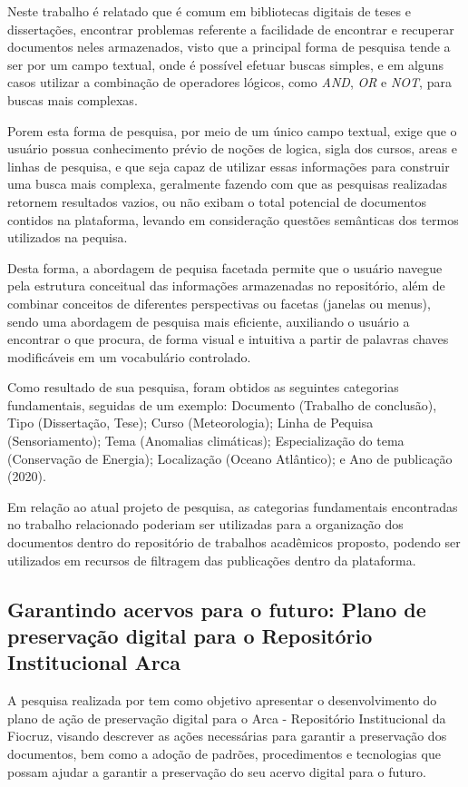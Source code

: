 Neste trabalho é relatado que é comum em bibliotecas digitais de teses
e dissertações, encontrar problemas referente a facilidade de encontrar
e recuperar documentos neles armazenados, visto que a principal forma de
pesquisa tende a ser por um campo textual, onde é possível efetuar buscas
simples, e em alguns casos utilizar a combinação de operadores lógicos, como
\emph{AND}, \emph{OR} e \emph{NOT}, para buscas mais complexas.

Porem esta forma de pesquisa, por meio de um único campo textual,
exige que o usuário possua conhecimento prévio de noções de logica,
sigla dos cursos, areas e linhas de pesquisa, e que seja capaz de
utilizar essas informações para construir uma busca mais complexa,
geralmente fazendo com que as pesquisas realizadas retornem resultados
vazios, ou não exibam o total potencial de documentos contidos na plataforma,
levando em consideração questões semânticas dos termos utilizados na pequisa.

Desta forma, a abordagem de pequisa facetada permite que o usuário navegue
pela estrutura conceitual das informações armazenadas no repositório, além de
combinar conceitos de diferentes perspectivas ou facetas (janelas ou menus), sendo uma abordagem
de pesquisa mais eficiente, auxiliando o usuário a encontrar o que procura,
de forma visual e intuitiva a partir de palavras chaves modificáveis em um
vocabulário controlado.

Como resultado de sua pesquisa, foram obtidos as seguintes categorias
fundamentais, seguidas de um exemplo: Documento (Trabalho de conclusão), Tipo (Dissertação, Tese);
Curso (Meteorologia); Linha de Pequisa (Sensoriamento);
Tema (Anomalias climáticas); Especialização do tema (Conservação de Energia);
Localização (Oceano Atlântico); e Ano de publicação (2020).

Em relação ao atual projeto de pesquisa, as categorias fundamentais encontradas
no trabalho relacionado poderiam ser utilizadas para a organização dos documentos dentro do repositório
de trabalhos acadêmicos proposto, podendo ser utilizados em recursos de
filtragem das publicações dentro da plataforma.

\subsection{Garantindo acervos para o futuro: Plano de preservação digital para o Repositório Institucional Arca}

A pesquisa realizada por \cite{QueirozArca:2020} tem como objetivo
apresentar o desenvolvimento do plano de ação de preservação digital
para o Arca - Repositório Institucional da Fiocruz, visando descrever
as ações necessárias para garantir a preservação dos documentos, bem como
a adoção de padrões, procedimentos e tecnologias que possam ajudar a garantir
a preservação do seu acervo digital para o futuro.

